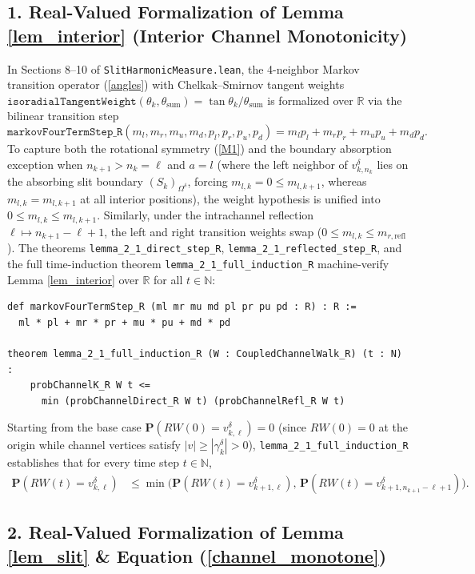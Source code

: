 \documentclass[]{amsart}
\numberwithin{equation}{section}
\newcommand{\R}{\mathbb{R}}
\newcommand{\N}{\mathbb{N}}
\begin{document}
\subsection*{1. Real-Valued Formalization of Lemma \ref{lem_interior} (Interior Channel Monotonicity)}

In Sections 8--10 of \texttt{SlitHarmonicMeasure.lean}, the 4-neighbor Markov transition operator (\ref{angles}) with Chelkak--Smirnov tangent weights $\texttt{isoradialTangentWeight}(\theta_k, \theta_{\text{sum}}) = \tan\theta_k / \theta_{\text{sum}}$ is formalized over $\R$ via the bilinear transition step
\[
\texttt{markovFourTermStep\_R}(m_l, m_r, m_u, m_d, p_l, p_r, p_u, p_d)
= m_l p_l + m_r p_r + m_u p_u + m_d p_d.
\]
To capture both the rotational symmetry (\ref{M1}) and the boundary absorption exception when $n_{k+1} > n_k = \ell$ and $a = l$ (where the left neighbor of $v^{\delta}_{k,n_k}$ lies on the absorbing slit boundary $(S_k)_{\Omega^{\delta}}$, forcing $m_{l,k} = 0 \le m_{l,k+1}$, whereas $m_{l,k} = m_{l,k+1}$ at all interior positions), the weight hypothesis is unified into $0 \le m_{l,k} \le m_{l,k+1}$. Similarly, under the intrachannel reflection $\ell \mapsto n_{k+1} - \ell + 1$, the left and right transition weights swap ($0 \le m_{l,k} \le m_{r,\text{refl}}$). The theorems \texttt{lemma\_2\_1\_direct\_step\_R}, \texttt{lemma\_2\_1\_reflected\_step\_R}, and the full time-induction theorem \texttt{lemma\_2\_1\_full\_induction\_R} machine-verify Lemma \ref{lem_interior} over $\R$ for all $t \in \N$:

{\small
\begin{verbatim}
def markovFourTermStep_R (ml mr mu md pl pr pu pd : R) : R :=
  ml * pl + mr * pr + mu * pu + md * pd

theorem lemma_2_1_full_induction_R (W : CoupledChannelWalk_R) (t : N) :
    probChannelK_R W t <=
      min (probChannelDirect_R W t) (probChannelRefl_R W t)
\end{verbatim}
}
Starting from the base case $\mathbf{P}(RW(0) = v^{\delta}_{k,\ell}) = 0$ (since $RW(0) = 0$ at the origin while channel vertices satisfy $|v| \ge |\gamma^{\delta}_k| > 0$), \texttt{lemma\_2\_1\_full\_induction\_R} establishes that for every time step $t \in \N$,
\begin{align*}
\mathbf{P}(RW(t) = v^{\delta}_{k,\ell}) &\le \min\bigl(\mathbf{P}(RW(t) = v^{\delta}_{k+1,\ell}),\, \mathbf{P}(RW(t) = v^{\delta}_{k+1,n_{k+1}-\ell+1})\bigr).
\end{align*}

\subsection*{2. Real-Valued Formalization of Lemma \ref{lem_slit} \& Equation (\ref{channel_monotone})}
\end{document}
